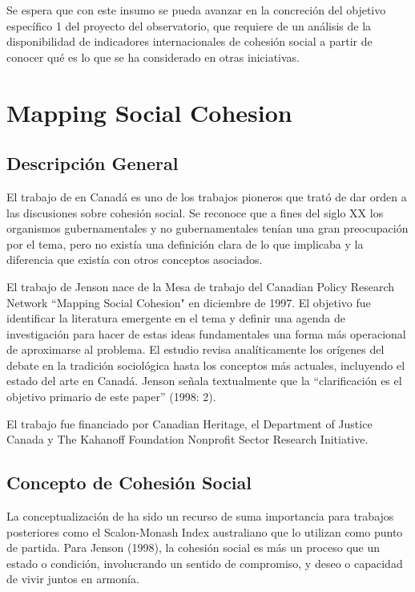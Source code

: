 \documentclass[
  12pt,
]{book}
\begin{document}
Se espera que con este insumo se pueda avanzar en la concreción del
objetivo específico 1 del proyecto del observatorio, que requiere de un
análisis de la disponibilidad de indicadores internacionales de cohesión
social a partir de conocer qué es lo que se ha considerado en otras
iniciativas.

\hypertarget{mapping-social-cohesion}{%
\chapter{Mapping Social Cohesion}\label{mapping-social-cohesion}}

\hypertarget{descripciuxf3n-general}{%
\section{Descripción General}\label{descripciuxf3n-general}}

El trabajo de \citet{jenson1998mapping} en Canadá es uno de los trabajos
pioneros que trató de dar orden a las discusiones sobre cohesión social.
Se reconoce que a fines del siglo XX los organismos gubernamentales y no
gubernamentales tenían una gran preocupación por el tema, pero no
existía una definición clara de lo que implicaba y la diferencia que
existía con otros conceptos asociados.

El trabajo de Jenson nace de la Mesa de trabajo del Canadian Policy
Research Network ``Mapping Social Cohesion" en diciembre de 1997. El
objetivo fue identificar la literatura emergente en el tema y definir
una agenda de investigación para hacer de estas ideas fundamentales una
forma más operacional de aproximarse al problema. El estudio revisa
analíticamente los orígenes del debate en la tradición sociológica hasta
los conceptos más actuales, incluyendo el estado del arte en Canadá.
Jenson señala textualmente que la ``clarificación es el objetivo primario
de este paper'' (1998: 2).

El trabajo fue financiado por Canadian Heritage, el Department of
Justice Canada y The Kahanoff Foundation Nonprofit Sector Research
Initiative.

\hypertarget{concepto-de-cohesiuxf3n-social}{%
\section{Concepto de Cohesión Social}\label{concepto-de-cohesiuxf3n-social}}

La conceptualización de \citet{jenson1998mapping} ha sido un recurso de suma
importancia para trabajos posteriores como el Scalon-Monash Index
australiano que lo utilizan como punto de partida. Para Jenson (1998),
la cohesión social es más un proceso que un estado o condición,
involucrando un sentido de compromiso, y deseo o capacidad de vivir
juntos en armonía.
\end{document}
